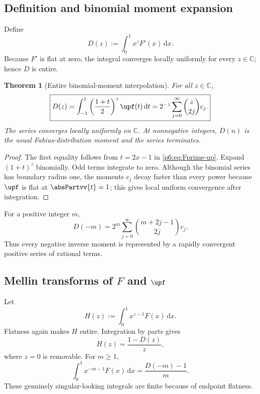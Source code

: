 \documentclass[11pt,oneside]{article}
\newtheorem{theorem}{Theorem}[section]
\theoremstyle{definition}
\theoremstyle{remark}
\newcommand{\C}{\mathbb C}
\newcommand{\dd}{\,\mathrm d}
\newcommand{\1}{\mathbf 1}
\begin{document}
\subsection{Definition and binomial moment expansion}

Define
\begin{equation}
 D(z):=\int_0^1x^zF'(x)\dd x.                             \label{p6:eq:D-def}
\end{equation}
Because \(F'\) is flat at zero, the integral converges locally uniformly for every
\(z\in\C\); hence \(D\) is entire.

\begin{theorem}[Entire binomial-moment interpolation]
\label{p6:thm:D-series}
For all \(z\in\C\),
\begin{equation}
 \boxed{
 D(z)=\int_{-1}^1\left(\frac{1+t}{2}\right)^z\upf(t)\dd t
 =2^{-z}\sum_{j=0}^{\infty}\binom z{2j}c_j.
 }                                                        \label{p6:eq:D-series}
\end{equation}
The series converges locally uniformly on \(\C\).  At nonnegative integers, \(D(n)\)
is the usual Fabius-distribution moment and the series terminates.
\end{theorem}

\begin{proof}
The first equality follows from \(t=2x-1\) in \eqref{p6:eq:Fprime-up}.  Expand
\((1+t)^z\) binomially.  Odd terms integrate to zero.  Although the binomial series has
boundary radius one, the moments \(c_j\) decay faster than every power because \(\upf\)
is flat at \(\absPartvv{t}=1\); this gives local uniform convergence after integration.
\end{proof}

For a positive integer \(m\),
\begin{equation}
 D(-m)=2^m\sum_{j=0}^{\infty}
 \binom{m+2j-1}{2j}c_j.                                  \label{p6:eq:D-negative-integer}
\end{equation}
Thus every negative inverse moment is represented by a rapidly convergent positive
series of rational terms.

\subsection{Mellin transforms of \(F\) and \(\upf\)}

Let
\begin{equation}
 H(z):=\int_0^1x^{z-1}F(x)\dd x.                          \label{p6:eq:H-def}
\end{equation}
Flatness again makes \(H\) entire.  Integration by parts gives
\begin{equation}
 \boxed{H(z)=\frac{1-D(z)}{z}},                            \label{p6:eq:H-D}
\end{equation}
where \(z=0\) is removable.  For \(m\ge1\),
\begin{equation}
 \int_0^1x^{-m-1}F(x)\dd x=\frac{D(-m)-1}{m}.            \label{p6:eq:negative-F-moments}
\end{equation}
These genuinely singular-looking integrals are finite because of endpoint flatness.
\end{document}
